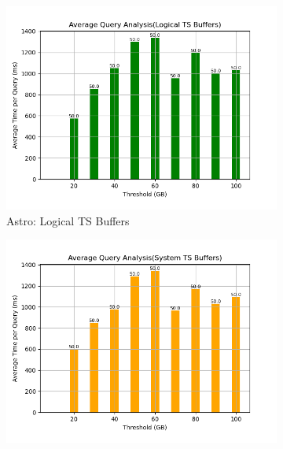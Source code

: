 \begin{figure}
	\centering
	\begin{subfigure}[c]{0.45\textwidth}
		\includegraphics[width=1\textwidth]   {figures/Experiments/Dynamic/ASTRO/Batch_processing/60/average_query_time_per_batch_version_999777015_10485760_10_delay[60].png}
		\caption{Astro: Logical TS Buffers}
		\label{fig:logical-ts-60-astro}
	\end{subfigure}
	\begin{subfigure}[c]{0.45\textwidth}
		\includegraphics[width=1\textwidth]	 {figures/Experiments/Dynamic/ASTRO/Batch_processing/60/average_query_time_per_batch_version_999777018_10485760_10_delay[60].png}

\end{subfigure}
\end{figure}
